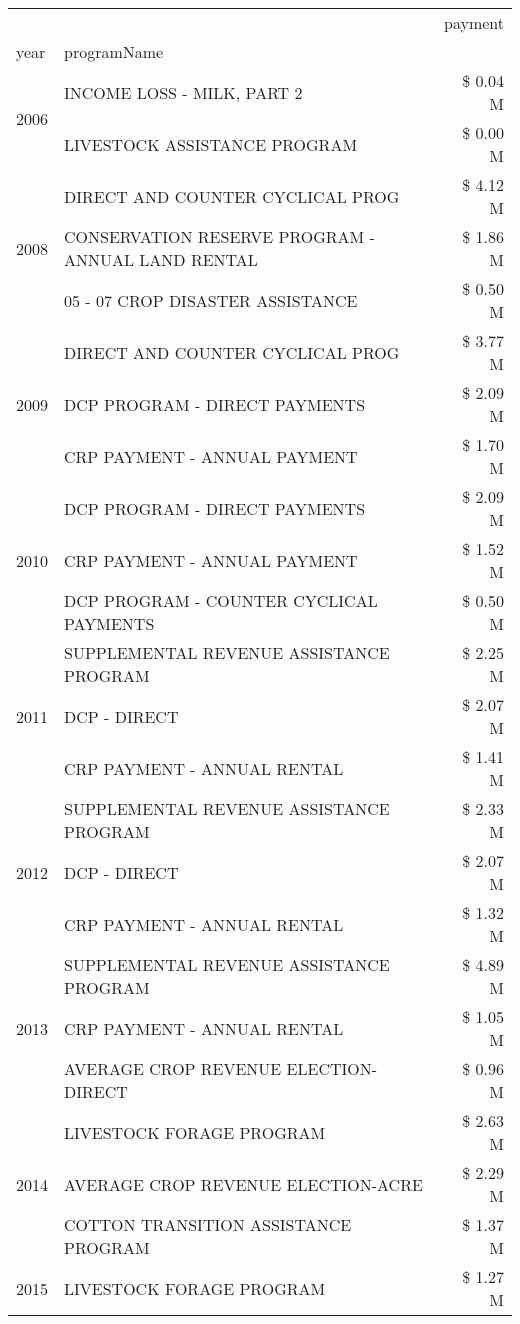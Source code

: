 \begin{tabular}{llr}
\toprule
 &  & payment \\
year & programName &  \\
\midrule
\multirow[t]{2}{*}{2006} & INCOME LOSS - MILK, PART 2 & \$ 0.04 M \\
 & LIVESTOCK ASSISTANCE PROGRAM & \$ 0.00 M \\
\cline{1-3}
\multirow[t]{3}{*}{2008} & DIRECT AND COUNTER CYCLICAL PROG & \$ 4.12 M \\
 & CONSERVATION RESERVE PROGRAM - ANNUAL LAND RENTAL & \$ 1.86 M \\
 & 05 - 07 CROP DISASTER ASSISTANCE & \$ 0.50 M \\
\cline{1-3}
\multirow[t]{3}{*}{2009} & DIRECT AND COUNTER CYCLICAL PROG & \$ 3.77 M \\
 & DCP PROGRAM - DIRECT PAYMENTS & \$ 2.09 M \\
 & CRP PAYMENT - ANNUAL PAYMENT & \$ 1.70 M \\
\cline{1-3}
\multirow[t]{3}{*}{2010} & DCP PROGRAM - DIRECT PAYMENTS & \$ 2.09 M \\
 & CRP PAYMENT - ANNUAL PAYMENT & \$ 1.52 M \\
 & DCP PROGRAM - COUNTER CYCLICAL PAYMENTS & \$ 0.50 M \\
\cline{1-3}
\multirow[t]{3}{*}{2011} & SUPPLEMENTAL REVENUE ASSISTANCE PROGRAM & \$ 2.25 M \\
 & DCP - DIRECT & \$ 2.07 M \\
 & CRP PAYMENT - ANNUAL RENTAL & \$ 1.41 M \\
\cline{1-3}
\multirow[t]{3}{*}{2012} & SUPPLEMENTAL REVENUE ASSISTANCE PROGRAM & \$ 2.33 M \\
 & DCP - DIRECT & \$ 2.07 M \\
 & CRP PAYMENT - ANNUAL RENTAL & \$ 1.32 M \\
\cline{1-3}
\multirow[t]{3}{*}{2013} & SUPPLEMENTAL REVENUE ASSISTANCE PROGRAM & \$ 4.89 M \\
 & CRP PAYMENT - ANNUAL RENTAL & \$ 1.05 M \\
 & AVERAGE CROP REVENUE ELECTION-DIRECT & \$ 0.96 M \\
\cline{1-3}
\multirow[t]{3}{*}{2014} & LIVESTOCK FORAGE PROGRAM & \$ 2.63 M \\
 & AVERAGE CROP REVENUE ELECTION-ACRE & \$ 2.29 M \\
 & COTTON TRANSITION ASSISTANCE PROGRAM & \$ 1.37 M \\
\cline{1-3}
\multirow[t]{3}{*}{2015} & LIVESTOCK FORAGE PROGRAM & \$ 1.27 M \\

\end{tabular}
